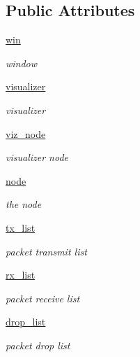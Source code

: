 \subsection*{Public Attributes}
\begin{DoxyCompactItemize}
\item 
\hyperlink{classshow__last__packets_1_1ShowLastPackets_a6a9100fa3cf84db3e07a20e257adb254}{win}
\begin{DoxyCompactList}\small\item\em window \end{DoxyCompactList}\item 
\hyperlink{classshow__last__packets_1_1ShowLastPackets_aafe3eb5d6509654089b644b42c63f177}{visualizer}
\begin{DoxyCompactList}\small\item\em visualizer \end{DoxyCompactList}\item 
\hyperlink{classshow__last__packets_1_1ShowLastPackets_a7bef1901e6a888f94e936a21eb53a46b}{viz\+\_\+node}
\begin{DoxyCompactList}\small\item\em visualizer node \end{DoxyCompactList}\item 
\hyperlink{classshow__last__packets_1_1ShowLastPackets_a0c618af7788119c3c1c4927a512f3558}{node}
\begin{DoxyCompactList}\small\item\em the node \end{DoxyCompactList}\item 
\hyperlink{classshow__last__packets_1_1ShowLastPackets_a20a0ef63b8cf999d312e67d61782bced}{tx\+\_\+list}
\begin{DoxyCompactList}\small\item\em packet transmit list \end{DoxyCompactList}\item 
\hyperlink{classshow__last__packets_1_1ShowLastPackets_ad92d52823bdcd5748306be45682dc7e3}{rx\+\_\+list}
\begin{DoxyCompactList}\small\item\em packet receive list \end{DoxyCompactList}\item 
\hyperlink{classshow__last__packets_1_1ShowLastPackets_acb325aab75d37f20a4de80dc39f6ea11}{drop\+\_\+list}
\begin{DoxyCompactList}\small\item\em packet drop list \end{DoxyCompactList}\item 

\end{DoxyCompactItemize}
